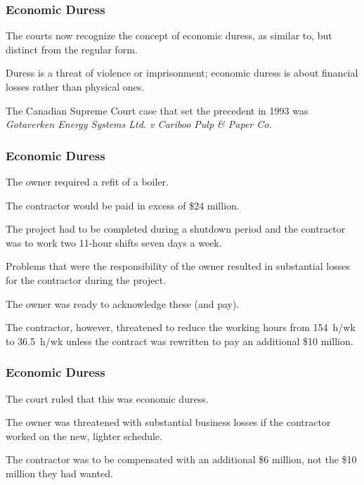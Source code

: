\begin{frame}
\frametitle{Economic Duress}

The courts now recognize the concept of economic duress, as similar to, but distinct from the regular form.

Duress is a threat of violence or imprisonment; economic duress is about financial losses rather than physical ones.

The Canadian Supreme Court case that set the precedent in 1993 was \textit{Gotaverken Energy Systems Ltd. v Cariboo Pulp \& Paper Co.}

\end{frame}



\begin{frame}
\frametitle{Economic Duress}

The owner required a refit of a boiler.

The contractor would be paid in excess of \$24 million.

The project had to be completed during a shutdown period and the contractor was to work two 11-hour shifts seven days a week.

Problems that were the responsibility of the owner resulted in substantial losses for the contractor during the project.

The owner was ready to acknowledge these (and pay).

The contractor, however, threatened to reduce the working hours from 154~h/wk to 36.5~h/wk unless the contract was rewritten to pay an additional \$10 million.

\end{frame}



\begin{frame}
\frametitle{Economic Duress}

The court ruled that this was economic duress.

The owner was threatened with substantial business losses if the contractor worked on the new, lighter schedule.

The contractor was to be compensated with an additional \$6 million, not the \$10 million they had wanted.


\end{frame}



